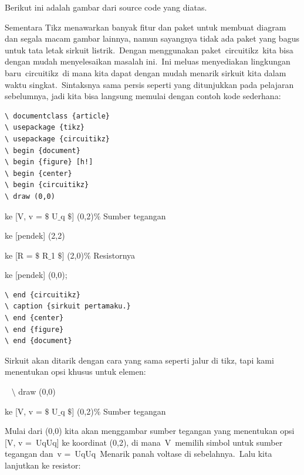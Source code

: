 \noindent
Berikut ini adalah gambar dari source code yang diatas.
\par 

\noindent 
Sementara Tikz menawarkan banyak fitur dan paket untuk membuat diagram dan segala macam gambar lainnya, namun sayangnya tidak ada paket yang bagus untuk tata letak sirkuit listrik. Dengan menggunakan paket circuitikz kita bisa dengan mudah menyelesaikan masalah ini. Ini meluas menyediakan lingkungan baru circuitikz di mana kita dapat dengan mudah menarik sirkuit kita dalam waktu singkat. Sintaksnya sama persis seperti yang ditunjukkan pada pelajaran sebelumnya, jadi kita bisa langsung memulai dengan contoh kode sederhana:
\par

\begin{verbatim}
\ documentclass {article}
\ usepackage {tikz}
\ usepackage {circuitikz}
\ begin {document}
\ begin {figure} [h!]
\ begin {center}
\ begin {circuitikz}
\ draw (0,0)

\end{verbatim}


\noindent 
 ke [V, v = $\$$ U$ \_ $q $\$$] (0,2)$\%$ Sumber tegangan
\par


\noindent 
 ke [pendek] (2,2)
\par


\noindent 
 ke [R = $\$$ R$ \_ $1 $\$$] (2,0)$\%$ Resistornya
\par


\noindent 
 ke [pendek] (0,0);
\par

\begin{verbatim}
\ end {circuitikz}
\ caption {sirkuit pertamaku.}
\ end {center}
\ end {figure}
\ end {document} 

\end{verbatim}

\noindent 
Sirkuit akan ditarik dengan cara yang sama seperti jalur di tikz, tapi kami menentukan opsi khusus untuk elemen:
\par


\noindent 
~ $\setminus$ draw (0,0)
\par


\noindent 
 ke [V, v = $\$$ U$ \_ $q $\$$] (0,2)$\%$ Sumber tegangan 
\par


\noindent 
Mulai dari (0,0) kita akan menggambar sumber tegangan yang menentukan opsi [V, v = UqUq] ke koordinat (0,2), di mana V memilih simbol untuk sumber tegangan dan v = UqUq Menarik panah voltase di sebelahnya. Lalu kita lanjutkan ke resistor:
\par


